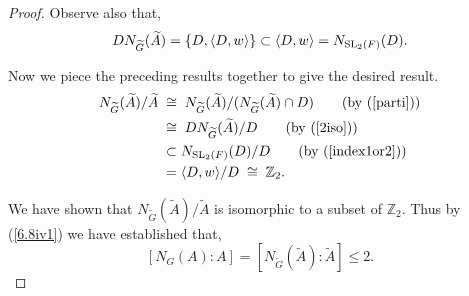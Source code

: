 \begin{proof}
  Observe also that, 
  \begin{align}\label{index1or2} DN_{\widetilde{G}}({\widetilde{A}}) = \{ D, \langle D, w \rangle \} \subset \langle D, w \rangle = N_{\operatorname{SL}_2(F)}(D).
  \end{align}
  
  Now we piece the preceding results together to give the desired result.
  \begin{align*}  N_{\widetilde{G}}({\widetilde{A}}) / {\widetilde{A}} \; & \cong \;  N_{\widetilde{G}}({\widetilde{A}})/( N_{\widetilde{G}}({\widetilde{A}}) \cap D) \tag{by (\ref{parti})}
  \\ & \cong \; DN_{\widetilde{G}}({\widetilde{A}}) / D \tag{by (\ref{2iso})}
  \\ & \subset N_{\SL_2(F)}(D) / D \tag{by (\ref{index1or2})}
  \\ &= \langle D, w \rangle / D \; \cong \; \mathbb{Z}_2.
  \end{align*}
  
  We have shown that $N_{\widetilde{G}}({\widetilde{A}}) / {\widetilde{A}}$ is isomorphic to a subset of $\mathbb{Z}_2$. Thus by (\ref{6.8iv1}) we have established that, $$[N_G(A): A] = [N_{\widetilde{G}}({\widetilde{A}}): {\widetilde{A}}] \leq 2.$$
  \vspace{-2mm}
\end{proof}


